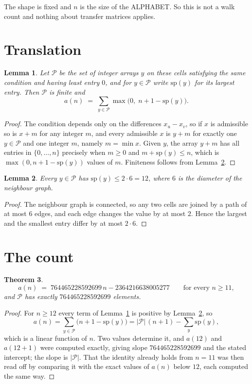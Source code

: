 \documentclass[11pt,a4paper]{article}
\theoremstyle{plain}
\newtheorem{theorem}{Theorem}
\newtheorem{lemma}[theorem]{Lemma}
\theoremstyle{definition}
\begin{document}
The shape is fixed and $n$ is the size of the ALPHABET. So this is not a walk count and
nothing about transfer matrices applies.

\section{Translation}

\begin{lemma}\label{lem:trans}
Let $\mathcal P$ be the set of integer arrays $y$ on these cells satisfying the same condition
and having least entry $0$, and for $y\in\mathcal P$ write $\mathrm{sp}(y)$ for its largest
entry. Then $\mathcal P$ is finite and
\[
a(n)\;=\;\sum_{y\in\mathcal P}\max\bigl(0,\;n+1-\mathrm{sp}(y)\bigr).
\]
\end{lemma}

\begin{proof}
The condition depends only on the differences $x_u-x_v$, so if $x$ is admissible so is $x+m$
for any integer $m$, and every admissible $x$ is $y+m$ for exactly one $y\in\mathcal P$ and one
integer $m$, namely $m=\min x$. Given $y$, the array $y+m$ has all entries in
$\{0,\dots,n\}$ precisely when $m\ge0$ and $m+\mathrm{sp}(y)\le n$, which is
$\max(0,n+1-\mathrm{sp}(y))$ values of $m$. Finiteness follows from
Lemma~\ref{lem:bound}.
\end{proof}

\begin{lemma}\label{lem:bound}
Every $y\in\mathcal P$ has $\mathrm{sp}(y)\le 2\cdot6=12$, where $6$ is the
diameter of the neighbour graph.
\end{lemma}

\begin{proof}
The neighbour graph is connected, so any two cells are joined by a path of at most $6$
edges, and each edge changes the value by at most $2$. Hence the largest and the smallest
entry differ by at most $2\cdot6$.
\end{proof}

\section{The count}

\begin{theorem}\label{thm:line}
\[
a(n)\;=\;764465228592699\,n-2364216638005277\qquad\text{for every }n\ge11,
\]
and $\mathcal P$ has exactly $764465228592699$ elements.
\end{theorem}

\begin{proof}
For $n\ge12$ every term of Lemma~\ref{lem:trans} is positive by
Lemma~\ref{lem:bound}, so
\[
a(n)=\sum_{y\in\mathcal P}\bigl(n+1-\mathrm{sp}(y)\bigr)
=|\mathcal P|\,(n+1)-\sum_{y}\mathrm{sp}(y),
\]
which is a linear function of $n$. Two values determine it, and $a(12)$ and
$a(12+1)$ were computed exactly, giving slope $764465228592699$ and the stated intercept; the slope
is $|\mathcal P|$. That the identity already holds from $n=11$ was then read off by
comparing it with the exact values of $a(n)$ below $12$, each computed the same way.
\end{proof}
\end{document}
